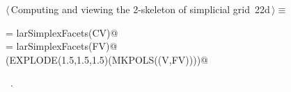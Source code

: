 \documentclass[11pt,oneside]{article}	%
\begin{document}
\begin{flushleft} \small
\begin{minipage}{\linewidth} \label{scrap53}
\protect{}$\langle\,$Computing and viewing the 2-skeleton of simplicial grid\nobreak\ {\footnotesize 22d}$\,\rangle\equiv$
\vspace{-1ex}
\begin{list}{}{} \item
\mbox{}\verb@FV = larSimplexFacets(CV)@\\
\mbox{}\verb@EV = larSimplexFacets(FV)@\\
\mbox{}\verb@VIEW(EXPLODE(1.5,1.5,1.5)(MKPOLS((V,FV))))@\\
\mbox{}\verb@@{\NWsep}
\end{list}
\vspace{-1ex}
\footnotesize\addtolength{\baselineskip}{-1ex}
\begin{list}{}{\setlength{\itemsep}{-\parsep}\setlength{\itemindent}{-\leftmargin}}
\item \NWtxtMacroRefIn\ .
\end{list}
\end{minipage}\\[4ex]
\end{flushleft}
\end{document}
